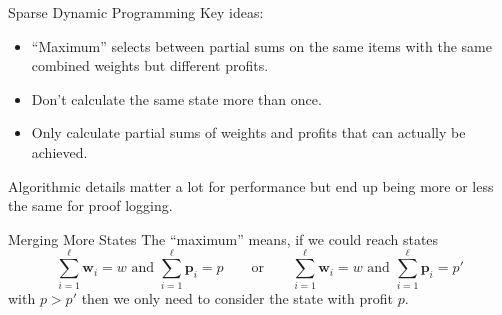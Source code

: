 \documentclass[aspectratio=169,compress,10pt]{beamer}
\begin{document}
\begin{frame}{Sparse Dynamic Programming}
    Key ideas:
    \begin{itemize}
        \item ``Maximum'' selects between partial sums on the same items with the same
            combined weights but different profits.
        \item Don't calculate the same state more than once.
        \item Only calculate partial sums of weights and profits that can actually be
            achieved.
    \end{itemize}
    \bigskip
    Algorithmic details matter a lot for performance but end up being more or less the same for proof logging.
\end{frame}

\begin{frame}{Merging More States}
    The ``maximum'' means, if we could reach states \begin{equation*}
        \sum_{i=1}^{\ell} \boldsymbol{w}_i = w \text{~and~} \sum_{i=1}^{\ell} \boldsymbol{p}_i = p
        \qquad \text{or} \qquad
        \sum_{i=1}^{\ell} \boldsymbol{w}_i = w \text{~and~} \sum_{i=1}^{\ell} \boldsymbol{p}_i = p'
    \end{equation*}
    with $p > p'$ then we only need to consider the state with profit $p$.

    \bigskip

\end{frame}
\end{document}

